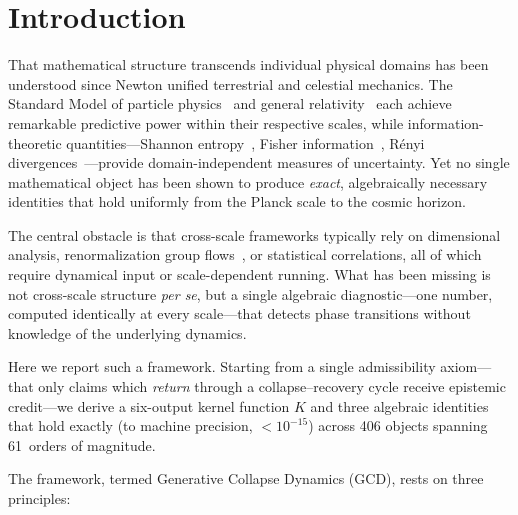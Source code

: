 \documentclass[
  aps,
  prx,
  twocolumn,
  superscriptaddress,
  nofootinbib,
  floatfix
]{revtex4-2}
\begin{document}
\maketitle

\section{Introduction}

That mathematical structure transcends individual physical domains has
been understood since Newton unified terrestrial and celestial
mechanics. The Standard Model of particle
physics~\cite{pdg2024} and general relativity~\cite{einstein1916gr}
each achieve remarkable predictive power within their respective
scales, while information-theoretic quantities---Shannon
entropy~\cite{shannon1948}, Fisher information~\cite{fisher1925,
rao1945information}, R\'{e}nyi divergences~\cite{renyi1961measures}---provide
domain-independent measures of uncertainty. Yet no single mathematical
object has been shown to produce \emph{exact}, algebraically necessary
identities that hold uniformly from the Planck scale to the cosmic
horizon.

The central obstacle is that cross-scale frameworks typically rely on
dimensional analysis, renormalization group
flows~\cite{gross1973,politzer1973}, or statistical correlations, all
of which require dynamical input or scale-dependent running. What has
been missing is not cross-scale structure \emph{per se}, but a single
algebraic diagnostic---one number, computed identically at every
scale---that detects phase transitions without knowledge of the
underlying dynamics.

Here we report such a framework. Starting from a single admissibility
axiom---that only claims which \emph{return} through a
collapse--recovery cycle receive epistemic credit---we derive a
six-output kernel function $K$ and three algebraic identities that
hold exactly (to machine precision, $<\!10^{-15}$) across 406
objects spanning 61~orders of magnitude.

The framework, termed Generative Collapse Dynamics (GCD), rests on
three principles:
\end{document}
